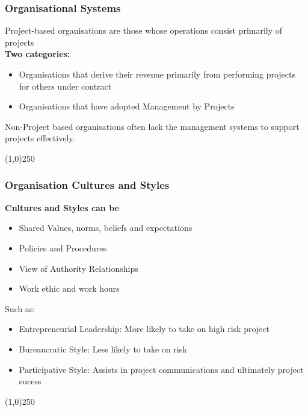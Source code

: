 \begin{frame}
\frametitle{Organisational Systems}
Project-based organisations are those whose operations consist primarily of projects\\
\textbf{Two categories:}\\
\begin{itemize}
	\item Organisations that derive their revenue primarily from performing projects for others under contract
	\item Organisations that have adopted Management by Projects
\end{itemize}
Non-Project based organisations often lack the management systems to support projects effectively.\\
\end{frame}
\begin{center}\line(1,0){250}\end{center}



\begin{frame}
\frametitle{Organisation Cultures and Styles}
\textbf{Cultures and Styles can be}\\
		\begin{itemize}
			\item Shared Values, norms, beliefs and expectations
			\item Policies and Procedures
			\item View of Authority Relationships
			\item Work ethic and work hours
		\end{itemize}
Such as:\\
\begin{itemize}
	\item Entrepreneurial Leadership: More likely to take on high risk project
	\item Bureaucratic Style: Less likely to take on risk
	\item Participative Style: Assists in project communications and ultimately project sucess
\end{itemize}
\end{frame}
\begin{center}\line(1,0){250}\end{center}



